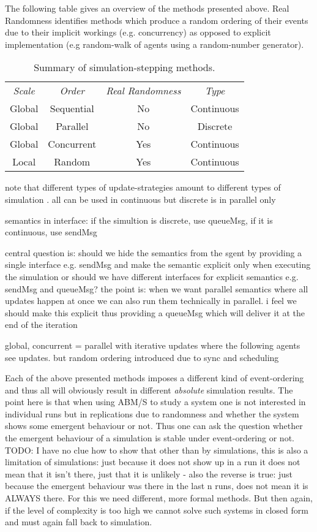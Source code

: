 \bigskip 

The following table gives an overview of the methods presented above. Real Randomness identifies methods which produce a random ordering of their events due to their implicit workings (e.g.  concurrency) as opposed to explicit implementation (e.g random-walk of agents using a random-number generator).

\begin{table}[H]
	\center
	\begin{tabular}{ c | c | c | c }
		\textit{Scale} & \textit{Order} & \textit{Real Randomness} & \textit{Type}\\
		\hhline{=|=|=}
	    Global & Sequential & No & Continuous \\ 
	    \hline
	    Global & Parallel & No & Discrete \\ 
	    \hline
	    Global & Concurrent & Yes & Continuous \\ 
	    \hline
	    Local & Random & Yes & Continuous \\ 
	\end{tabular}
	\caption{Summary of simulation-stepping methods.}
\end{table}

note that different types of update-strategies amount to different types of simulation . all can be used in continuous but discrete is in parallel only

semantics in interface: if the simultion is discrete, use queueMsg, if it is continuous, use sendMsg

central question is: should we hide the semantics from the sgent by providing a single interface e.g. sendMsg and make the semantic explicit only when executing the simulation or should we have different interfaces for explicit semantics e.g. sendMsg and queueMsg? the point is: when we want parallel semantics where all updates happen at once we can also run them technically in parallel. i feel we should make this explicit thus providing a queueMsg which will deliver it at the end of the iteration

global, concurrent = parallel with iterative updates where the following agents see updates. but random ordering introduced due to sync and scheduling

Each of the above presented methods imposes a different kind of event-ordering and thus all will obviously result in different \textit{absolute} simulation results. The point here is that when using ABM/S to study a system one is not interested in individual runs but in replications due to randomness and whether the system shows some emergent behaviour or not. Thus one can ask the question whether the emergent behaviour of a simulation is stable under event-ordering or not. TODO: I have no clue how to show that other than by simulations, this is also a limitation of simulations: just because it does not show up in a run it does not mean that it isn't there, just that it is unlikely - also the reverse is true: just because the emergent behaviour was there in the last n runs, does not mean it is ALWAYS there. For this we need different, more formal methods. But then again, if the level of complexity is too high we cannot solve such systems in closed form and must again fall back to simulation.